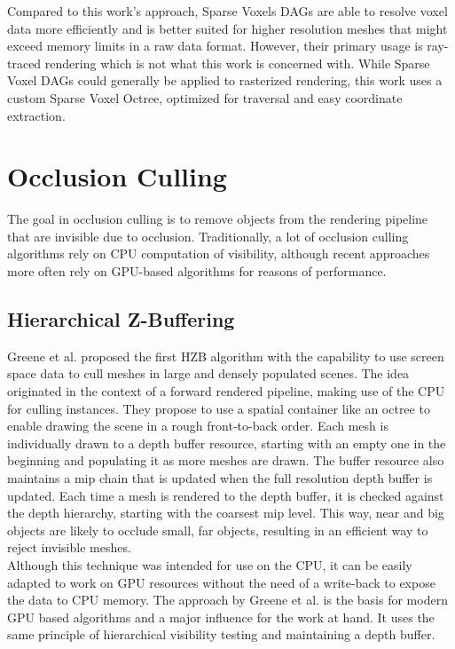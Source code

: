 \noindent
Compared to this work's approach, Sparse Voxels \ac{DAG}s are able to resolve voxel data more efficiently and is 
better suited for higher resolution meshes that might exceed memory limits in a raw data format. However, their 
primary usage is ray-traced rendering which is not what this work is concerned with. While Sparse Voxel \ac{DAG}s 
could generally be applied to rasterized rendering, this work uses a custom Sparse Voxel Octree, optimized for 
traversal and easy coordinate extraction. 


\section{Occlusion Culling}

The goal in occlusion culling is to remove objects from the rendering pipeline that are invisible due to 
occlusion. Traditionally, a lot of occlusion culling algorithms rely on \ac{CPU} computation of visibility, 
although recent approaches more often rely on \ac{GPU}-based algorithms for reasons of performance. 


\subsection*{Hierarchical Z-Buffering}

Greene et al. \cite{Greene93,Greene95} proposed the first \ac{HZB} algorithm with the capability to use screen space 
data to cull meshes in large and densely populated scenes. The idea originated in the context of a forward rendered 
pipeline, making use of the \ac{CPU} for culling instances. They propose to use a spatial container like an octree to 
enable drawing the scene in a rough front-to-back order. Each mesh is individually drawn to a depth buffer resource, 
starting with an empty one in the beginning and populating it as more meshes are drawn. The buffer resource also 
maintains a mip chain that is updated when the full resolution depth buffer is updated. Each time a mesh is rendered 
to the depth buffer, it is checked against the depth hierarchy, starting with the coarsest mip level. This way, near 
and big objects are likely to occlude small, far objects, resulting in an efficient way to reject invisible meshes.\\

\noindent
Although this technique was intended for use on the \ac{CPU}, it can be easily adapted to work on \ac{GPU} resources 
without the need of a write-back to expose the data to \ac{CPU} memory. The approach by Greene et al. is the basis for 
modern \ac{GPU} based algorithms and a major influence for the work at hand. It uses the same principle of hierarchical 
visibility testing and maintaining a depth buffer. \\


